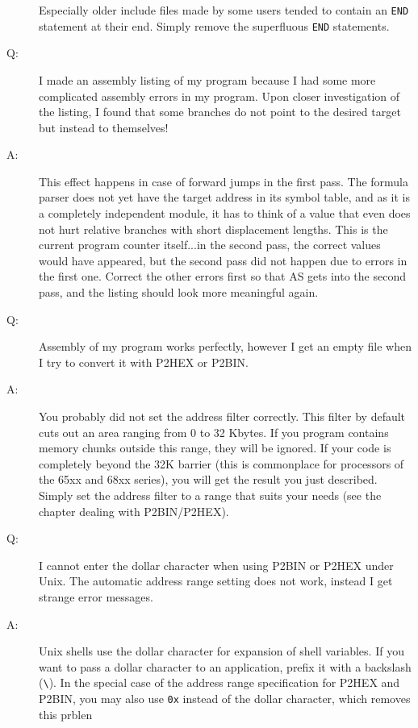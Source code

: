 \documentclass[12pt,twoside]{report}
\newcommand{\tty}[1]{{\tt #1}}
\begin{document}
\begin{description}
{   Especially older include files made by some users tended to
   contain an \tty{END} statement at their end.  Simply remove the
   superfluous \tty{END} statements.}
\vspace{0.3cm}
\item[Q:]{I made an assembly listing of my program because I had some more
   complicated assembly errors in my program.  Upon closer
   investigation of the listing, I found that some branches do not
   point to the desired target but instead to themselves!}
\item[A:]{This effect happens in case of forward jumps in the first pass.
   The formula parser does not yet have the target address in its symbol
   table, and as it is a completely independent module, it has to think of
   a value that even does not hurt relative branches with short displacement
   lengths.  This is the current program counter itself...in the
   second pass, the correct values would have appeared, but the second
   pass did not happen due to errors in the first one.  Correct the
   other errors first so that AS gets into the second pass, and the
   listing should look more meaningful again.}
\vspace{0.3cm}
\item[Q:]{Assembly of my program works perfectly, however I get an empty
   file when I try to convert it with P2HEX or P2BIN.}
\item[A:]{You probably did not set the address filter correctly.  This
   filter by default cuts out an area ranging from 0 to 32 Kbytes.
   If you program contains memory chunks outside this range, they
   will be ignored.  If your code is completely beyond the 32K 
   barrier (this is commonplace for processors of the 65xx and 68xx
   series), you will get the result you just described.  Simply
   set the address filter to a range that suits your needs (see the
   chapter dealing with P2BIN/P2HEX).}
\vspace{0.3cm}
\item[Q:]{I cannot enter the dollar character when using P2BIN or P2HEX
   under Unix.  The automatic address range setting does not work, instead
   I get strange error messages.}
\item[A:]{Unix shells use the dollar character for expansion of shell
   variables.  If you want to pass a dollar character to an application,
   prefix it with a backslash (\verb!\!).  In the special case of the
   address range specification for P2HEX and P2BIN, you may also use
   \tty{0x} instead of the dollar character, which removes this prblen
}
\end{description}
\end{document}
